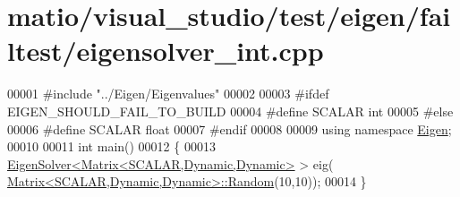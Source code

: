 \hypertarget{matio_2visual__studio_2test_2eigen_2failtest_2eigensolver__int_8cpp_source}{}\section{matio/visual\+\_\+studio/test/eigen/failtest/eigensolver\+\_\+int.cpp}
\label{matio_2visual__studio_2test_2eigen_2failtest_2eigensolver__int_8cpp_source}

\begin{DoxyCode}
00001 \textcolor{preprocessor}{#include "../Eigen/Eigenvalues"}
00002 
00003 \textcolor{preprocessor}{#ifdef EIGEN\_SHOULD\_FAIL\_TO\_BUILD}
00004 \textcolor{preprocessor}{#define SCALAR int}
00005 \textcolor{preprocessor}{#else}
00006 \textcolor{preprocessor}{#define SCALAR float}
00007 \textcolor{preprocessor}{#endif}
00008 
00009 \textcolor{keyword}{using namespace }\hyperlink{namespace_eigen}{Eigen};
00010 
00011 \textcolor{keywordtype}{int} main()
00012 \{
00013   \hyperlink{group___eigenvalues___module_class_eigen_1_1_eigen_solver}{EigenSolver<Matrix<SCALAR,Dynamic,Dynamic>} > eig(
      \hyperlink{group___core___module_class_eigen_1_1_matrix}{Matrix<SCALAR,Dynamic,Dynamic>::Random}(10,10));
00014 \}
\end{DoxyCode}
